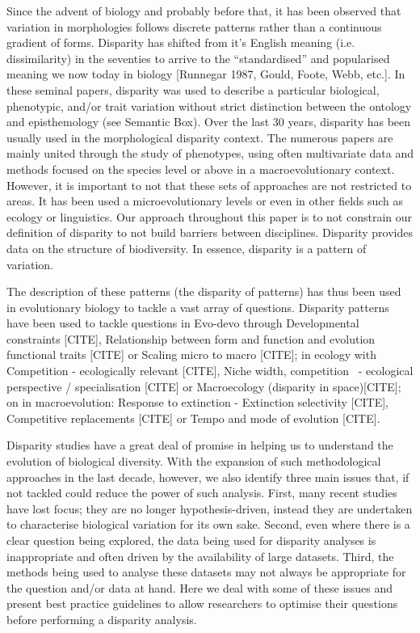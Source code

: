 \documentclass[12pt,letterpaper]{article}
\begin{document}
Since the advent of biology and probably before that, it has been observed that variation in morphologies follows discrete patterns rather than a continuous gradient of forms.
Disparity has shifted from it's English meaning (i.e. dissimilarity) in the seventies to arrive to the ``standardised'' and popularised meaning we now today in biology [Runnegar 1987, Gould, Foote, Webb, etc.].
In these seminal papers, disparity was used to describe a particular biological, phenotypic, and/or trait variation without strict distinction between the ontology and episthemology (see Semantic Box).
Over the last 30 years, disparity has been usually used in the morphological disparity context.
The numerous papers are mainly united through the study of phenotypes, using often multivariate data and methods focused on the species level or above in a macroevolutionary context.
However, it is important to not that these sets of approaches are not restricted to areas.
It has been used a microevolutionary levels or even in other fields such as ecology or linguistics.
Our approach throughout this paper is to not constrain our definition of disparity to not build barriers between disciplines.
Disparity provides data on the structure of biodiversity.
In essence, disparity is a pattern of variation.

The description of these patterns (the disparity of patterns) has thus been used in evolutionary biology to tackle a vast array of questions.
Disparity patterns have been used to tackle questions in Evo-devo through
Developmental constraints [CITE],
Relationship between form and function and evolution functional traits [CITE] or
Scaling micro to macro [CITE];
in ecology with
Competition - ecologically relevant [CITE],
Niche width, competition  - ecological perspective / specialisation [CITE] or
Macroecology (disparity in space)[CITE];
on in macroevolution:
Response to extinction - Extinction selectivity [CITE],
Competitive replacements [CITE] or
Tempo and mode of evolution [CITE].

Disparity studies have a great deal of promise in helping us to understand the evolution of biological diversity.
With the expansion of such methodological approaches in the last decade, however, we also identify three main issues that, if not tackled could reduce the power of such analysis.
First, many recent studies have lost focus; they are no longer hypothesis-driven, instead they are undertaken to characterise biological variation for its own sake.
Second, even where there is a clear question being explored, the data being used for disparity analyses is inappropriate and often driven by the availability of large datasets.
Third, the methods being used to analyse these datasets may not always be appropriate for the question and/or data at hand.
Here we deal with some of these issues and present best practice guidelines to allow researchers to optimise their questions before performing a disparity analysis.
\end{document}
